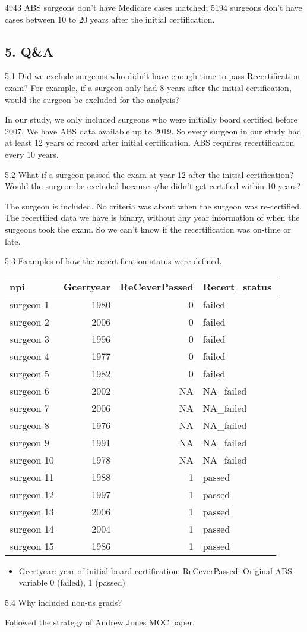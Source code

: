 \documentclass[
]{article}
\providecommand{\tightlist}{%
  \setlength{\itemsep}{0pt}\setlength{\parskip}{0pt}}
\begin{document}
4943 ABS surgeons don't have Medicare cases matched; 5194 surgeons don't
have cases between 10 to 20 years after the initial certification.

\hypertarget{qa}{%
\subsection{5. Q\&A}\label{qa}}

5.1 Did we exclude surgeons who didn't have enough time to pass
Recertification exam? For example, if a surgeon only had 8 years after
the initial certification, would the surgeon be excluded for the
analysis?

In our study, we only included surgeons who were initially board
certified before 2007. We have ABS data available up to 2019. So every
surgeon in our study had at least 12 years of record after initial
certification. ABS requires recertification every 10 years.

5.2 What if a surgeon passed the exam at year 12 after the initial
certification? Would the surgeon be excluded because s/he didn't get
certified within 10 years?

The surgeon is included. No criteria was about when the surgeon was
re-certified. The recertified data we have is binary, without any year
information of when the surgeons took the exam. So we can't know if the
recertification was on-time or late.

5.3 Examples of how the recertification status were defined.

\begin{table}[H]
\centering
\begin{tabular}{l|r|r|l}
\hline
npi & Gcertyear & ReCeverPassed & Recert\_status\\
\hline
surgeon 1 & 1980 & 0 & failed\\
\hline
surgeon 2 & 2006 & 0 & failed\\
\hline
surgeon 3 & 1996 & 0 & failed\\
\hline
surgeon 4 & 1977 & 0 & failed\\
\hline
surgeon 5 & 1982 & 0 & failed\\
\hline
surgeon 6 & 2002 & NA & NA\_failed\\
\hline
surgeon 7 & 2006 & NA & NA\_failed\\
\hline
surgeon 8 & 1976 & NA & NA\_failed\\
\hline
surgeon 9 & 1991 & NA & NA\_failed\\
\hline
surgeon 10 & 1978 & NA & NA\_failed\\
\hline
surgeon 11 & 1988 & 1 & passed\\
\hline
surgeon 12 & 1997 & 1 & passed\\
\hline
surgeon 13 & 2006 & 1 & passed\\
\hline
surgeon 14 & 2004 & 1 & passed\\
\hline
surgeon 15 & 1986 & 1 & passed\\
\hline
\end{tabular}
\end{table}

\begin{itemize}
\tightlist
\item
  Gcertyear: year of initial board certification; ReCeverPassed:
  Original ABS variable 0 (failed), 1 (passed)
\end{itemize}

5.4 Why included non-us grads?

Followed the strategy of Andrew Jones MOC paper.
\end{document}
